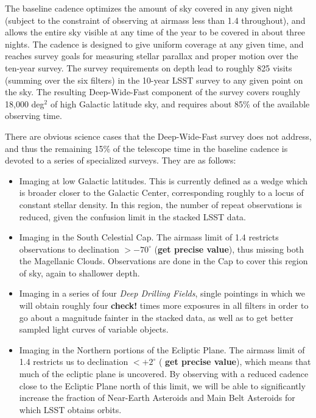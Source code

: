    The baseline cadence optimizes the amount of sky covered in any
   given night (subject to the constraint of observing at airmass less
   than 1.4 throughout), and allows the entire sky visible at any time
   of the year to be covered in about three nights.  The cadence is
   designed to give uniform coverage at any given time, and reaches
   survey goals for measuring stellar parallax and proper motion over
   the ten-year survey.  The survey requirements on depth lead to
   roughly 825 visits (summing over the six filters) in the 10-year
   LSST survey to any given point on the sky.  The resulting
   Deep-Wide-Fast component of the survey covers roughly 18,000
   deg$^2$ of high Galactic latitude sky, and requires about 85\% of
   the available observing time. 

   There are obvious science cases that the Deep-Wide-Fast survey does
   not address, and thus the remaining 15\% of the telescope time in
   the baseline cadence is devoted to a series of specialized
   surveys.  They are as follows: 
\begin{itemize} 
\item Imaging at low Galactic latitudes.  This is currently defined as
  a wedge which is broader closer to the Galactic Center,
  corresponding roughly to a locus of constant stellar density.  In
  this region, the number of repeat observations is reduced, given the
  confusion limit in the stacked LSST data. 
\item Imaging in the South Celestial Cap.  The airmass limit of 1.4
  restricts observations to declination $> -70^\circ$ ({\bf get
    precise value}), thus missing both the Magellanic Clouds.
  Observations are done in the Cap to cover this region of sky, again
  to shallower depth. 
\item Imaging in a series of four {\em Deep Drilling Fields}, single
  pointings in which 
  we will obtain roughly four {\bf check!} times more exposures in all
  filters in order to go about a magnitude fainter in the stacked
  data, as well as to get better sampled light curves of variable
  objects. 
\item Imaging in the Northern portions of the Ecliptic Plane.  The
  airmass limit of 1.4 restricts us to declination $< +2^\circ$ ({\bf
    get precise value}), which means that much of the ecliptic plane
  is uncovered.  By observing with a reduced cadence close to the
  Ecliptic Plane north of this limit, we will be able to significantly
  increase the fraction of Near-Earth Asteroids and Main Belt
  Asteroids for which LSST obtains orbits.
\end{itemize}

